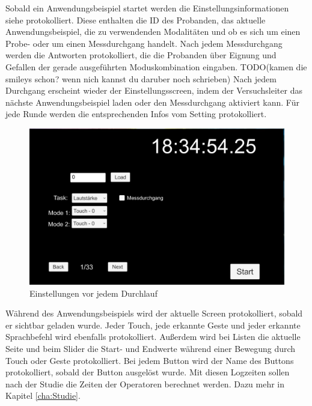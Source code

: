 Sobald ein Anwendungsbeispiel startet werden die Einstellungsinformationen siehe  protokolliert. 
Diese enthalten die ID des Probanden, das aktuelle Anwendungsbeispiel, die zu verwendenden Modalitäten und ob es sich um einen Probe- oder um einen Messdurchgang handelt. 
Nach jedem Messdurchgang werden die Antworten protokolliert, die die Probanden über Eignung und Gefallen der gerade ausgeführten Moduskombination eingaben. TODO(kamen die smileys schon? wenn nich kannst du daruber noch schrieben)
Nach jedem Durchgang erscheint wieder der Einstellungsscreen, indem der Versuchsleiter das nächste Anwendungsbeispiel laden oder den Messdurchgang aktiviert kann. 
Für jede Runde werden die entsprechenden Infos vom Setting protokolliert.
\begin{figure}[ht]
  \centering
  \includegraphics[width=1\textwidth]{img/SettingsPrototyp.jpg}
  \caption{Einstellungen vor jedem Durchlauf}
  \label{fig:ProbandenSettings}
\end{figure} 

Während des Anwendungsbeispiels wird der aktuelle Screen protokolliert, sobald er sichtbar geladen wurde. 
Jeder Touch, jede erkannte Geste und jeder erkannte Sprachbefehl wird ebenfalls protokolliert. 
Außerdem wird bei Listen die aktuelle Seite und beim Slider die Start- und Endwerte während einer Bewegung durch Touch oder Geste protokolliert. 
Bei jedem Button wird der Name des Buttons protokolliert, sobald der Button ausgelöst wurde. 
Mit diesen Logzeiten sollen nach der Studie die Zeiten der Operatoren berechnet werden. 
Dazu mehr in Kapitel \ref{cha:Studie}.  
